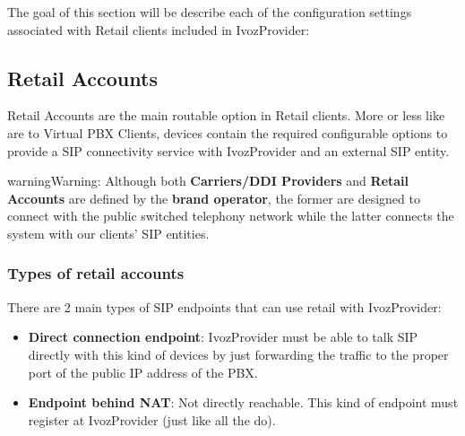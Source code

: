 \documentclass[letterpaper,10pt,english]{sphinxmanual}
\begin{document}
The goal of this section will be describe each of the configuration settings
associated with Retail clients included in IvozProvider:


\subsection{Retail Accounts}
\label{administration_portal/client/retail/retail_accounts::doc}\label{administration_portal/client/retail/retail_accounts:retail-accounts}\label{administration_portal/client/retail/retail_accounts:id1}
Retail Accounts are the main routable option in Retail clients.
More or less like {\hyperref[administration_portal/client/vpbx/routing_endpoints/friends/index:friends]{}} are to Virtual PBX Clients, devices
contain the required configurable options to provide a SIP connectivity
service with IvozProvider and an external SIP entity.

\begin{notice}{warning}{Warning:}
Although both \textbf{Carriers/DDI Providers} and \textbf{Retail Accounts} are defined by the
\textbf{brand operator}, the former are designed to connect with the public switched telephony network
while the latter connects the system with our clients' SIP entities.
\end{notice}


\subsubsection{Types of retail accounts}
\label{administration_portal/client/retail/retail_accounts:types-of-retail-accounts}
There are 2 main types of SIP endpoints that can use retail with IvozProvider:
\begin{itemize}
\item {} 
\textbf{Direct connection endpoint}: IvozProvider must be able to talk SIP directly with
this kind of devices by just forwarding the traffic to the proper port of
the public IP address of the PBX.

\item {} 
\textbf{Endpoint behind NAT}: Not directly reachable. This kind of endpoint must register at
IvozProvider (just like all the {\hyperref[administration_portal/client/vpbx/terminals:terminals]{}} do).

\end{itemize}
\end{document}
